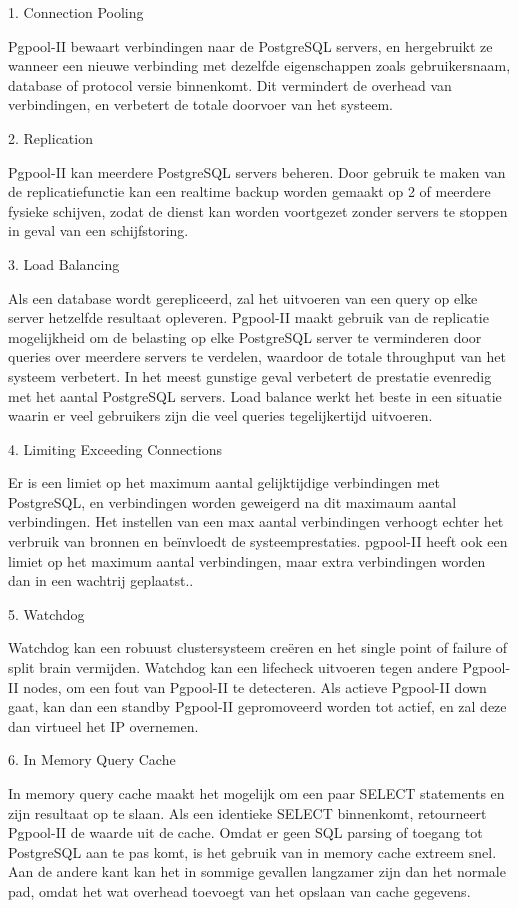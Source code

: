 1. Connection Pooling

Pgpool-II bewaart verbindingen naar de PostgreSQL servers, en hergebruikt ze wanneer een nieuwe verbinding met dezelfde eigenschappen zoals gebruikersnaam, database of protocol versie binnenkomt. Dit vermindert de overhead van verbindingen, en verbetert de totale doorvoer van het systeem.

2. Replication

Pgpool-II kan meerdere PostgreSQL servers beheren. Door gebruik te maken van de replicatiefunctie kan een realtime backup worden gemaakt op 2 of meerdere fysieke schijven, zodat de dienst kan worden voortgezet zonder servers te stoppen in geval van een schijfstoring.

3. Load Balancing

Als een database wordt gerepliceerd, zal het uitvoeren van een query op elke server hetzelfde resultaat opleveren. Pgpool-II maakt gebruik van de replicatie mogelijkheid om de belasting op elke PostgreSQL server te verminderen door queries over meerdere servers te verdelen, waardoor de totale throughput van het systeem verbetert. In het meest gunstige geval verbetert de prestatie evenredig met het aantal PostgreSQL servers. Load balance werkt het beste in een situatie waarin er veel gebruikers zijn die veel queries tegelijkertijd uitvoeren.

4. Limiting Exceeding Connections

Er is een limiet op het maximum aantal gelijktijdige verbindingen met PostgreSQL, en verbindingen worden geweigerd na dit maximaum aantal verbindingen. Het instellen van een max aantal verbindingen verhoogt echter het verbruik van bronnen en beïnvloedt de systeemprestaties. pgpool-II heeft ook een limiet op het maximum aantal verbindingen, maar extra verbindingen worden dan in een wachtrij geplaatst..

5. Watchdog

Watchdog kan een robuust clustersysteem creëren en het single point of failure of split brain vermijden. Watchdog kan een lifecheck uitvoeren tegen andere Pgpool-II nodes, om een fout van Pgpool-II te detecteren. Als actieve Pgpool-II down gaat, kan dan een standby Pgpool-II gepromoveerd worden tot actief, en zal deze dan virtueel het IP overnemen.

6. In Memory Query Cache

In memory query cache maakt het mogelijk om een paar SELECT statements en zijn resultaat op te slaan. Als een identieke SELECT binnenkomt, retourneert Pgpool-II de waarde uit de cache. Omdat er geen SQL parsing of toegang tot PostgreSQL aan te pas komt, is het gebruik van in memory cache extreem snel. Aan de andere kant kan het in sommige gevallen langzamer zijn dan het normale pad, omdat het wat overhead toevoegt van het opslaan van cache gegevens.

